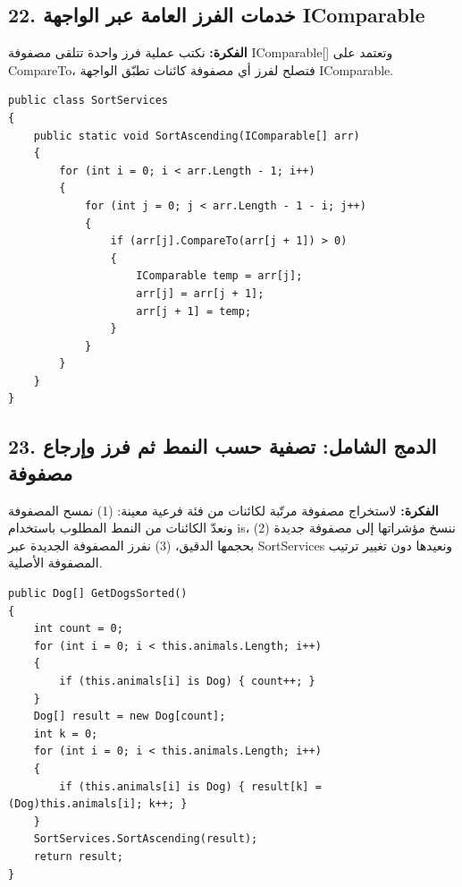 \documentclass[14pt]{extarticle}
\begin{document}
\filbreak
\subsection*{22. خدمات الفرز العامة عبر الواجهة \textenglish{IComparable}}
\textbf{الفكرة:} نكتب عملية فرز واحدة تتلقى مصفوفة \textenglish{IComparable[]} وتعتمد على \textenglish{CompareTo}، فتصلح لفرز أي مصفوفة كائنات تطبّق الواجهة \textenglish{IComparable}.

\begin{boxCode}
\begin{english}
\begin{verbatim}
public class SortServices
{
    public static void SortAscending(IComparable[] arr)
    {
        for (int i = 0; i < arr.Length - 1; i++)
        {
            for (int j = 0; j < arr.Length - 1 - i; j++)
            {
                if (arr[j].CompareTo(arr[j + 1]) > 0)
                {
                    IComparable temp = arr[j];
                    arr[j] = arr[j + 1];
                    arr[j + 1] = temp;
                }
            }
        }
    }
}
\end{verbatim}
\end{english}
\end{boxCode}

\filbreak
\subsection*{23. الدمج الشامل: تصفية حسب النمط ثم فرز وإرجاع مصفوفة}
\textbf{الفكرة:} لاستخراج مصفوفة مرتّبة لكائنات من فئة فرعية معينة: (1) نمسح المصفوفة ونعدّ الكائنات من النمط المطلوب باستخدام \textenglish{is}، (2) ننسخ مؤشراتها إلى مصفوفة جديدة بحجمها الدقيق، (3) نفرز المصفوفة الجديدة عبر \textenglish{SortServices} ونعيدها دون تغيير ترتيب المصفوفة الأصلية.

\begin{boxCode}
\begin{english}
\begin{verbatim}
public Dog[] GetDogsSorted()
{
    int count = 0;
    for (int i = 0; i < this.animals.Length; i++)
    {
        if (this.animals[i] is Dog) { count++; }
    }
    Dog[] result = new Dog[count];
    int k = 0;
    for (int i = 0; i < this.animals.Length; i++)
    {
        if (this.animals[i] is Dog) { result[k] = (Dog)this.animals[i]; k++; }
    }
    SortServices.SortAscending(result);
    return result;
}
\end{verbatim}
\end{english}
\end{boxCode}
\end{document}
